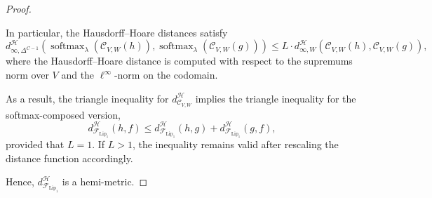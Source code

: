 \begin{proof}
\begin{itemize}
In particular, the Hausdorff–Hoare distances satisfy
\[
d_{\infty, \Delta^{C-1}}^\mathcal{H}(\operatorname{softmax}_\lambda( \mathcal{C}_{V,W}(h)), \operatorname{softmax}_\lambda (\mathcal{C}_{V,W}(g)) )
\leq L \cdot d^\mathcal{H}_{\infty, W}(\mathcal{C}_{V,W}(h), \mathcal{C}_{V,W}(g)),
\]
where the Hausdorff–Hoare distance is computed with respect to the supremums norm over \( V \) and the \( \ell^\infty \)-norm on the codomain.

As a result, the triangle inequality for \( d^\mathcal{H}_{\mathcal{C}_{V,W}} \) implies the triangle inequality for the softmax-composed version,
\[
d_{\mathcal{F}_{\mathrm{Lip}_1}}^{\mathcal{H}}(h,f) \leq d_{\mathcal{F}_{\mathrm{Lip}_1}}^{\mathcal{H}}(h,g) + d_{\mathcal{F}_{\mathrm{Lip}_1}}^{\mathcal{H}}(g,f),
\]
provided that \( L = 1 \).  
If \( L > 1 \), the inequality remains valid after rescaling the distance function accordingly.

    

\end{itemize}

Hence, \( d_{\mathcal{F}_{\mathrm{Lip}_1}}^{\mathcal{H}} \) is a hemi-metric.%



\end{proof}
